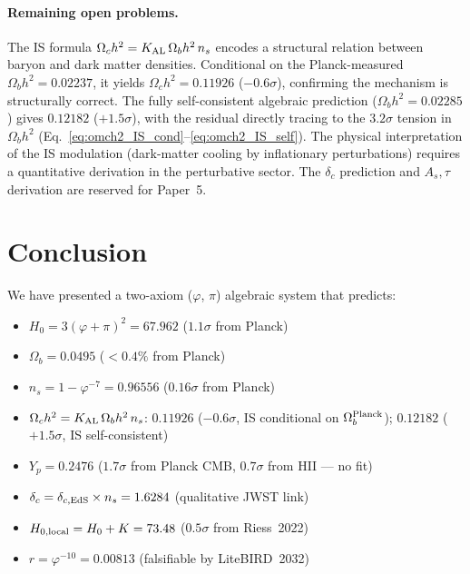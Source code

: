 \documentclass[12pt,a4paper]{article}
\begin{document}
\paragraph{Remaining open problems.}
The IS formula $\Omega_c h^2 = K_{\rm AL}\,\Omega_b h^2\,n_s$ encodes a structural
relation between baryon and dark matter densities. Conditional on the Planck-measured
$\Omega_b h^2=0.02237$, it yields $\Omega_c h^2=0.11926$ ($-0.6\sigma$), confirming
the mechanism is structurally correct. The fully self-consistent algebraic prediction
($\Omega_b h^2=0.02285$) gives $0.12182$ ($+1.5\sigma$), with the residual directly
tracing to the $3.2\sigma$ tension in $\Omega_b h^2$ (Eq.~\ref{eq:omch2_IS_cond}--\ref{eq:omch2_IS_self}).
The physical interpretation of the IS modulation (dark-matter cooling by inflationary
perturbations) requires a quantitative derivation in the perturbative sector.
The $\delta_c$ prediction and $A_s,\tau$ derivation are reserved for Paper~5.

\section{Conclusion}

We have presented a two-axiom ($\varphi$, $\pi$) algebraic system that predicts:
\begin{itemize}
  \item $H_0 = 3(\varphi+\pi)^2 = 67.962$ ($1.1\sigma$ from Planck)
  \item $\Omega_b = 0.0495$ ($<0.4\%$ from Planck)
  \item $n_s = 1-\varphi^{-7} = 0.96556$ ($0.16\sigma$ from Planck)
  \item $\Omega_c h^2 = K_{\rm AL}\,\Omega_b h^2\,n_s$: $0.11926$ ($-0.6\sigma$, IS conditional on $\Omega_b^{\rm Planck}$); $0.12182$ ($+1.5\sigma$, IS self-consistent)
  \item $Y_p = 0.2476$ ($1.7\sigma$ from Planck CMB, $0.7\sigma$ from HII — no fit)
  \item $\delta_c = \delta_{c,\rm EdS}\times n_s = 1.6284$ (qualitative JWST link)
  \item $H_{0,\rm local} = H_0 + K = 73.48$ ($0.5\sigma$ from Riess~2022)
  \item $r = \varphi^{-10} = 0.00813$ (falsifiable by LiteBIRD~2032)
\end{itemize}
\end{document}
